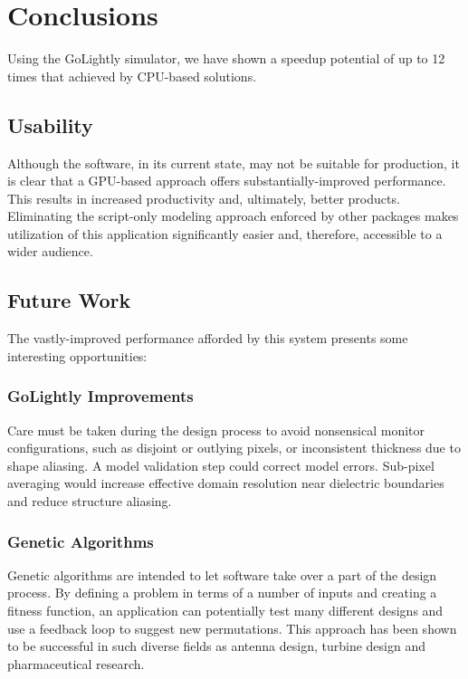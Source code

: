 \chapter{Conclusions} \label{ch:conclusions}

Using the GoLightly simulator, we have shown a speedup potential of up to 12 times that achieved by CPU-based solutions.

\section{Usability}

Although the software, in its current state, may not be suitable for production, it is clear that a GPU-based approach offers substantially-improved performance. This results in increased productivity and, ultimately, better products. Eliminating the script-only modeling approach enforced by other packages makes utilization of this application significantly easier and, therefore, accessible to a wider audience.

\section{Future Work}

The vastly-improved performance afforded by this system presents some interesting opportunities:

\subsection{GoLightly Improvements}

Care must be taken during the design process to avoid nonsensical monitor configurations, such as disjoint or outlying pixels, or inconsistent thickness due to shape aliasing. A model validation step could correct model errors. Sub-pixel averaging would increase effective domain resolution near dielectric boundaries and reduce structure aliasing. 

\clearpage

\subsection{Genetic Algorithms}
Genetic algorithms\cite{Mitchell:1998:IGA:522098}\cite{Goldberg:1989:GAS:534133}  are intended to let software take over a part of the design process. By defining a problem in terms of a number of inputs and creating a fitness function, an application can potentially test many different designs and use a feedback loop to suggest new permutations. This approach has been shown to be successful in such diverse fields as antenna design\cite{globus2006automated}, turbine design\cite{MOSETTI1994105} and pharmaceutical research\cite{Chi:2009:MLG:1651932.1652161}. 

